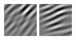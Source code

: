 \begin{figure}[ht]
\begin{center}
  \includegraphics[width=\columnwidth/9]{ch4/figures/real_3_2.jpg}
  \includegraphics[width=\columnwidth/9]{ch4/figures/real_3_3.jpg}

\end{center}
\end{figure}
